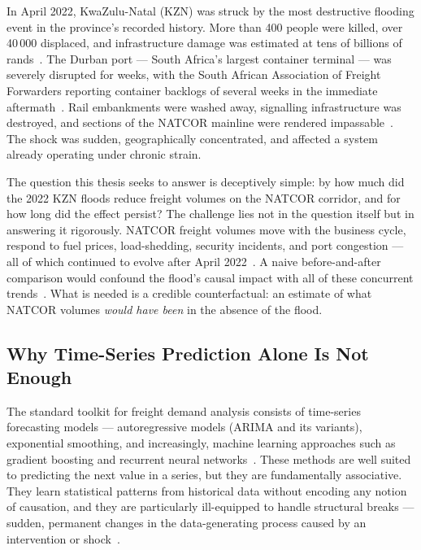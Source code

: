 In April 2022, KwaZulu-Natal (KZN) was struck by the most destructive
flooding event in the province's recorded history.
More than 400 people were killed, over 40\,000 displaced, and
infrastructure damage was estimated at tens of billions of
rands~\parencite{ndmc2022}.
The Durban port --- South Africa's largest container terminal ---
was severely disrupted for weeks, with the South African Association
of Freight Forwarders reporting container backlogs of several weeks
in the immediate aftermath~\parencite{saaff2022}.
Rail embankments were washed away, signalling infrastructure was
destroyed, and sections of the NATCOR mainline were rendered
impassable~\parencite{transnet2022floods}.
The shock was sudden, geographically concentrated, and affected a
system already operating under chronic strain.

The question this thesis seeks to answer is deceptively simple: by
how much did the 2022 KZN floods reduce freight volumes on the NATCOR
corridor, and for how long did the effect persist?
The challenge lies not in the question itself but in answering it
rigorously.
NATCOR freight volumes move with the business cycle, respond to fuel
prices, load-shedding, security incidents, and port congestion ---
all of which continued to evolve after April 2022~\parencite{havenga2021, transnet2023ar}.
A naive before-and-after comparison would confound the flood's causal
impact with all of these concurrent trends~\parencite{abadie2010}.
What is needed is a credible counterfactual: an estimate of what
NATCOR volumes \emph{would have been} in the absence of the flood.

\subsection{Why Time-Series Prediction Alone Is Not Enough}
\label{sec:why_causal}

The standard toolkit for freight demand analysis consists of
time-series forecasting models --- autoregressive models (ARIMA and
its variants), exponential smoothing, and increasingly, machine
learning approaches such as gradient boosting and recurrent neural
networks~\parencite{box2015time, hyndman2018forecasting}.
These methods are well suited to predicting the next value in a
series, but they are fundamentally associative.
They learn statistical patterns from historical data without encoding
any notion of causation, and they are particularly ill-equipped to
handle structural breaks --- sudden, permanent changes in the
data-generating process caused by an intervention or
shock~\parencite{pearl2009}.

